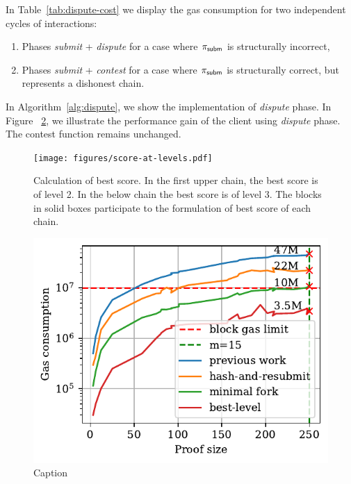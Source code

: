 In Table~\ref{tab:dispute-cost} we display the gas consumption for
two independent cycles of interactions:
\begin{enumerate}
    \item Phases \emph{submit} + \emph{dispute} for a case where $\mathsf{\pi_{subm}}$
is structurally incorrect,
    \item Phases \emph{submit} + \emph{contest} for a case where
$\mathsf{\pi_{subm}}$ is structurally correct, but represents a dishonest chain.
\end{enumerate}
\noindent
In Algorithm~\ref{alg:dispute}, we show the implementation of \emph{dispute}
phase. In Figure ~\ref{fig:dispute}, we illustrate the performance gain of the
client using \emph{dispute} phase. The \textsf{contest} function remains
unchanged.





\begin{figure}[!h]
    \begin{center}
        \texttt{[image: figures/score-at-levels.pdf]}
    \end{center}
    \caption{Calculation of best score. In the first upper chain, the best
    score is of level 2. In the below chain the best score is of level 3. The
    blocks in solid boxes participate to the formulation of best score of each
    chain.}
    \label{fig:score-at-levels}
\end{figure}

\begin{figure}[!h]
    \begin{center}
        \includegraphics[width=1\columnwidth]{figures/dispute.pdf}
    \end{center}
    \caption{Caption}
    \label{fig:dispute}
\end{figure}

